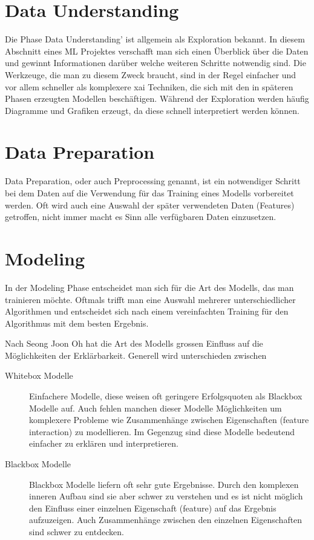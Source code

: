 \documentclass[
  12pt, %
  a4paper, %
  oneside, %
  openany, 
  numbers=noenddot, %
  BCOR=5mm, %
  parskip=half*, %
  thesis, %
]{bfhbook}
\begin{document}
\section{Data Understanding}
Die Phase Data Understanding' ist allgemein als Exploration bekannt.
In diesem Abschnitt eines \Gls{ML} Projektes verschafft man sich einen Überblick über die Daten und gewinnt Informationen darüber welche weiteren Schritte notwendig sind. Die Werkzeuge, die man zu diesem Zweck braucht, sind in der Regel einfacher und vor allem schneller als komplexere \Gls{xai} Techniken, die sich mit den in späteren Phasen erzeugten Modellen beschäftigen. Während der Exploration werden häufig Diagramme und Grafiken erzeugt, da diese schnell interpretiert werden können.

\section{Data Preparation}
Data Preparation, oder auch Preprocessing genannt, ist ein notwendiger Schritt bei dem Daten auf die Verwendung für das Training eines Modells vorbereitet werden. Oft wird auch eine Auswahl der später verwendeten Daten (Features) getroffen, nicht immer macht es Sinn alle verfügbaren Daten einzusetzen.

\section{Modeling}
In der Modeling Phase entscheidet man sich für die Art des Modells, das man trainieren möchte. Oftmals trifft man eine Auswahl mehrerer unterschiedlicher Algorithmen und entscheidet sich nach einem vereinfachten Training für den Algorithmus mit dem besten Ergebnis.

Nach Seong Joon Oh \parencite{Oh2019} hat die Art des Modells grossen Einfluss auf die Möglichkeiten der Erklärbarkeit. Generell wird unterschieden zwischen
\begin{description}
	\item[Whitebox Modelle] Einfachere Modelle, diese weisen oft geringere Erfolgsquoten als Blackbox Modelle auf. Auch fehlen manchen dieser Modelle Möglichkeiten um komplexere Probleme wie Zusammenhänge zwischen Eigenschaften (feature interaction) zu modellieren. Im Gegenzug sind diese Modelle bedeutend einfacher zu erklären und interpretieren.
	\item[Blackbox Modelle] Blackbox Modelle liefern oft sehr gute Ergebnisse. Durch den komplexen inneren Aufbau sind sie aber schwer zu verstehen und es ist nicht möglich den Einfluss einer einzelnen Eigenschaft (feature) auf das Ergebnis aufzuzeigen. Auch Zusammenhänge zwischen den einzelnen Eigenschaften sind schwer zu entdecken.
\end{description}
\end{document}
